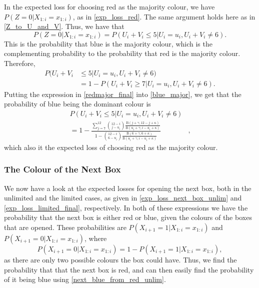 In the expected loss for choosing red as the majority colour, we have $P(Z=0|X_{1:i}=x_{1:i})$, as in \eqref{exp_loss_red}. The same argument holds here as in \eqref{Z_to_U_and_V}. Thus, we have that
\begin{equation}
    P(Z=0|X_{1:i}=x_{1:i}) = P(U_i+V_i \leq 5 | U_i=u_i,U_i+V_i \neq 6).
\end{equation}
This is the probability that blue is the majority colour, which is the complementing probability to the probability that red is the majority colour. Therefore,
\begin{equation}
\label{blue_major}
    \begin{aligned}
        P(U_i+V_i& \leq 5 | U_i=u_i,U_i+V_i \neq 6) \\
        &= 1 - P(U_i+V_i \geq 7 | U_i=u_i,U_i+V_i \neq 6).
    \end{aligned}
\end{equation}
Putting the expression in \eqref{redmajor_final} into \eqref{blue_major}, we get that the probability of blue being the dominant colour is
\begin{equation}
\label{blue_major_final}
    \begin{aligned}
        P(U_i+V_i \leq 5 | U_i=u_i,U_i+V_i \neq 6) &\\[6pt]
        = 1 - \frac{\sum_{j=7}^{12} \binom{12-i}{j-u_i} \frac{\text{B}(j+\gamma,12-j+\kappa)}{\text{B}(u_i+\gamma,i-u_i+\kappa)}}{1-\binom{12-i}{6-u_i} \frac{\text{B}(6+\gamma,6+\kappa)}{\text{B}(u_i+\gamma,i-u_i+\kappa)}}&,
    \end{aligned}
\end{equation}
which also it the expected loss of choosing red as the majority colour. 

\subsubsection{The Colour of the Next Box}
We now have a look at the expected losses for opening the next box, both in the unlimited and the limited cases, as given in \eqref{exp_loss_next_box_unlim} and \eqref{exp_loss_limited_final}, respectively. In both of these expressions we have the probability that the next box is either red or blue, given the colours of the boxes that are opened. 
These probabilities are $P(X_{i+1}=1|X_{1:i}=x_{1:i})$ and $P(X_{i+1}=0|X_{1:i}=x_{1:i})$, where 
\begin{equation}
\label{next_blue_from_red_unlim}
    P(X_{i+1}=0|X_{1:i}=x_{1:i}) = 1 - P(X_{i+1}=1|X_{1:i}=x_{1:i}),
\end{equation}
as there are only two possible colours the box could have. Thus, we find the probability that that the next box is red, and can then easily find the probability of it being blue using \eqref{next_blue_from_red_unlim}. 

